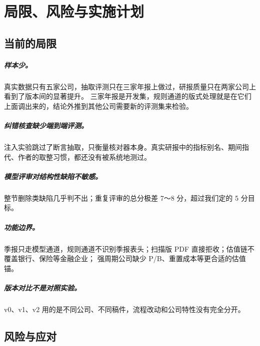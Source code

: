\chapter{局限、风险与实施计划}

\section{当前的局限}

\paragraph{样本少。}真实数据只有五家公司，抽取评测只在三家年报上做过，研报质量只在两家公司上看到了版本间的显著提升。
三家年报是开发集，规则通道的版式处理就是在它们上面调出来的，结论外推到其他公司需要新的评测集来检验。

\paragraph{纠错核查缺少端到端评测。}注入实验跳过了断言抽取，只衡量核对器本身。真实研报中的指标别名、期间指代、作者的取整习惯，都还没有被系统地测过。

\paragraph{模型评审对结构性缺陷不敏感。}整节删除类缺陷几乎判不出；重复评审的总分极差 7～8 分，超过我们定的 5 分目标。

\paragraph{功能边界。}季报只走模型通道，规则通道不识别季报表头；扫描版 PDF 直接拒收；估值链不覆盖银行、保险等金融企业；
强周期公司缺少 P/B、重置成本等更合适的估值锚。

\paragraph{版本对比不是对照实验。}v0、v1、v2 用的是不同公司、不同稿件，流程改动和公司特性没有完全分开。

\section{风险与应对}

